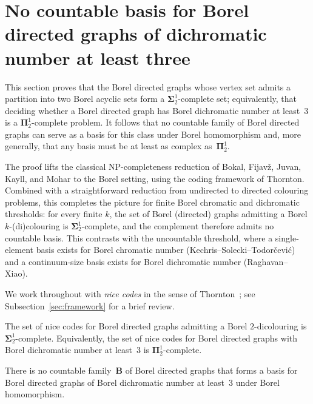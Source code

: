 
\section{No countable basis for Borel directed graphs of dichromatic number at least three}\label{sec:dichromatic}

This section proves that the Borel directed graphs whose vertex set admits a partition into two Borel acyclic sets form a $\mathbf\Sigma^1_2$-complete set; equivalently, that deciding whether a Borel directed graph has Borel dichromatic number at least~$3$ is a $\mathbf\Pi^1_2$-complete problem.
It follows that no countable family of Borel directed graphs can serve as a basis for this class under Borel homomorphism and, more generally, that any basis must be at least as complex as~$\mathbf\Pi^1_2$.

The proof lifts the classical NP-completeness reduction of Bokal, Fijav{\v{z}}, Juvan, Kayll, and Mohar to the Borel setting, using the coding framework of Thornton.
Combined with a straightforward reduction from undirected to directed colouring problems, this completes the picture for finite Borel chromatic and dichromatic thresholds: for every finite $k$, the set of Borel (directed) graphs admitting a Borel $k$-(di)colouring is $\mathbf\Sigma^1_2$-complete, and the complement therefore admits no countable basis.
This contrasts with the uncountable threshold, where a single-element basis exists for Borel chromatic number (Kechris--Solecki--Todor{\v{c}}evi{\'c}) and a continuum-size basis exists for Borel dichromatic number (Raghavan--Xiao).

We work throughout with \emph{nice codes} in the sense of Thornton~\cite{thornton2022algebraic, thornton-thesis}; see Subsection~\ref{sec:framework} for a brief review.

\begin{proposition}\label{prop:main}
	The set of nice codes for Borel directed graphs admitting a Borel $2$-dicolouring is $\mathbf\Sigma^1_2$-complete.
	Equivalently, the set of nice codes for Borel directed graphs with Borel dichromatic number at least~$3$ is $\mathbf\Pi^1_2$-complete.
\end{proposition}

\begin{corollary}\label{cor:no-basis}
	There is no countable family~$\mathbf{B}$ of Borel directed graphs that forms a basis for Borel directed graphs of Borel dichromatic number at least~$3$ under Borel homomorphism.
\end{corollary}

